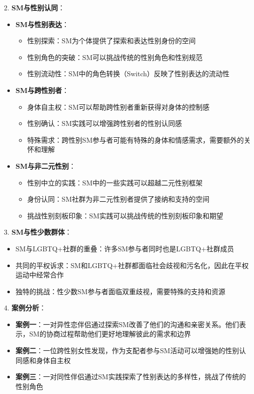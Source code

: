 \documentclass[12pt,UTF8]{ctexbook}
\begin{document}
2. \textbf{SM与性别认同}：
  \begin{itemize}
  \item \textbf{SM与性别表达}：
    \begin{itemize}
    \item 性别探索：SM为个体提供了探索和表达性别身份的空间
    \item 性别角色的突破：SM可以挑战传统的性别角色和性别规范
    \item 性别流动性：SM中的角色转换（Switch）反映了性别表达的流动性
    \end{itemize}
  \item \textbf{SM与跨性别者}：
    \begin{itemize}
    \item 身体自主权：SM可以帮助跨性别者重新获得对身体的控制感
    \item 性别确认：SM实践可以增强跨性别者的性别认同感
    \item 特殊需求：跨性别SM参与者可能有特殊的身体和情感需求，需要额外的关怀和理解
    \end{itemize}
  \item \textbf{SM与非二元性别}：
    \begin{itemize}
    \item 性别中立的实践：SM中的一些实践可以超越二元性别框架
    \item 身份认同：SM社群为非二元性别者提供了接纳和支持的空间
    \item 挑战性别刻板印象：SM实践可以挑战传统的性别刻板印象和期望
    \end{itemize}
  \end{itemize}

3. \textbf{SM与性少数群体}：
  \begin{itemize}
  \item SM与LGBTQ+社群的重叠：许多SM参与者同时也是LGBTQ+社群成员
  \item 共同的平权诉求：SM和LGBTQ+社群都面临社会歧视和污名化，因此在平权运动中经常合作
  \item 独特的挑战：性少数SM参与者面临双重歧视，需要特殊的支持和资源
  \end{itemize}

4. \textbf{案例分析}：
  \begin{itemize}
  \item \textbf{案例一}：一对异性恋伴侣通过探索SM改善了他们的沟通和亲密关系。他们表示，SM的协商过程帮助他们更好地理解彼此的需求和边界
  \item \textbf{案例二}：一位跨性别女性发现，作为支配者参与SM活动可以增强她的性别认同感和身体自主权
  \item \textbf{案例三}：一对同性伴侣通过SM实践探索了性别表达的多样性，挑战了传统的性别角色
  \end{itemize}
\end{document}
